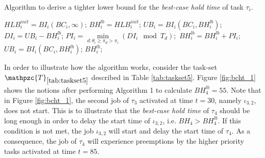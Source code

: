 \documentclass[fleqn]{article}
\begin{document}
\begin{algorithm}[H]
	\caption{Algorithm to derive a tighter lower bound for the \textit{best-case hold time} of task $\tau_i$.}\label{euclid}
	\begin{algorithmic}[1]
		\State $HLB^{init}_i = BI_i(BC_i,\infty)$;
		\State $BH^{lb}_i = HLB^{init}_i$;
		\State $UB_i = BI_i(BC_i,BH^{lb}_i)$;
		\State $DI_i = UB_i - BH^{lb}_i$;
		\State $PI_i = \min \limits_{d:\theta_i \geq \pi_d > \pi_i} (DI_i \mod T_d);$
		\State $BH^{lb}_i = BH^{lb}_i + PI_i$;
		\State $UB_i = BI_i(BC_i,BH^{lb}_i)$;
		\State \Return $BH^{lb}_i$; 
		\EndProcedure
	\end{algorithmic}
\end{algorithm}


In order to illustrate how the algorithm works, consider the task-set $\mathpzc{T}_{\ref{tab:taskset5}}$ described in Table \ref{tab:taskset5}. Figure \ref{fig:bcht_1} shows the notions after performing Algorithm 1 to calculate $BH^{lb}_4=55$. Note that in Figure \ref{fig:bcht_1}, the second job of $\tau_3$ activated at time $t=30$, namely $\iota_{3,2}$, does not start. This is to illustrate that the \textit{best-case hold time} of $\tau_4$ should be long enough in order to delay the start time of $\iota_{3,2}$, i.e. $BH_4 > BH^{lb}_4$. If this condition is not met, the job $\iota_{3,2}$ will start and delay the start time of $\tau_4$. As a consequence, the job of $\tau_4$ will experience preemptions by the higher priority tasks activated at time $t=85$.
\end{document}

